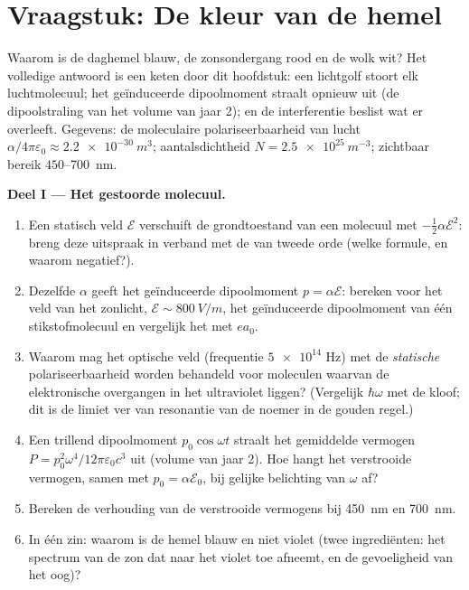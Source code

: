 \section{Vraagstuk: De kleur van de hemel}

\begin{problem}\label{pb:b3:perturbation-theory:1}
Waarom is de daghemel blauw, de zonsondergang rood en de wolk wit? Het
volledige antwoord is een keten door dit hoofdstuk: een lichtgolf stoort
elk luchtmolecuul; het geïnduceerde dipoolmoment straalt opnieuw uit (de
dipoolstraling van het volume van jaar 2); en de interferentie beslist wat
er overleeft. Gegevens: de moleculaire polariseerbaarheid van lucht
$\alpha/4\pi\varepsilon_0 \approx \qty{2.2e-30}{m^3}$; aantalsdichtheid
$N = \qty{2.5e25}{m^{-3}}$; zichtbaar bereik
$450$--\qty{700}{nm}.

\medskip\noindent\textbf{Deel I --- Het gestoorde molecuul.}
\begin{enumerate}
  \item Een statisch veld $\mathcal E$ verschuift de grondtoestand van
        een molecuul met $-\tfrac12\alpha\mathcal E^2$: breng deze
        uitspraak in verband met de  van tweede orde
        (welke formule, en waarom negatief?).
  \item Dezelfde $\alpha$ geeft het geïnduceerde dipoolmoment $p =
        \alpha\mathcal E$: bereken voor het veld van het zonlicht,
        $\mathcal E \sim
        \qty{800}{V/m}$, het geïnduceerde dipoolmoment
        van één stikstofmolecuul en vergelijk het met $ea_0$.
  \item Waarom mag het optische veld (frequentie $\num{5e14}$ Hz) met de
        \emph{statische} polariseerbaarheid worden behandeld voor
        moleculen waarvan de elektronische overgangen in het ultraviolet
        liggen? (Vergelijk $\hbar\omega$ met de kloof; dit is de limiet
        ver van resonantie van de noemer in de gouden regel.)
  \item Een trillend dipoolmoment $p_0\cos\omega t$ straalt het
        gemiddelde vermogen $P = p_0^2\omega^4/12\pi\varepsilon_0c^3$
        uit (volume van jaar 2). Hoe hangt het verstrooide vermogen,
        samen met $p_0 = \alpha\mathcal
        E_0$, bij gelijke belichting van
        $\omega$ af?
  \item Bereken de verhouding van de verstrooide vermogens bij
        \qty{450}{nm} en \qty{700}{nm}.
  \item In één zin: waarom is de hemel blauw en niet violet (twee
        ingrediënten: het spectrum van de zon dat naar het violet toe
        afneemt, en de gevoeligheid van het oog)?
\end{enumerate}


\end{problem}
